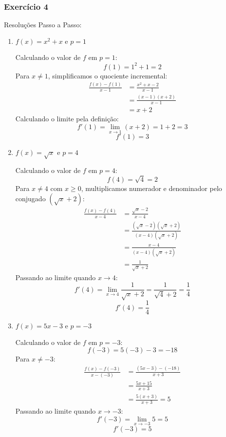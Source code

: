 \vspace{0.6cm}
\subsubsection*{Exercício 4}

Resoluções Passo a Passo:

\begin{enumerate}[label=\alph*)]
    \item $f(x) = x^2 + x$ e $p = 1$

    Calculando o valor de $f$ em $p = 1$:
    \[
    f(1) = 1^2 + 1 = 2
    \]
    Para $x \neq 1$, simplificamos o quociente incremental:
    \begin{align*}
        \frac{f(x) - f(1)}{x - 1} &= \frac{x^2 + x - 2}{x - 1} \\[0.20cm]
        &= \frac{(x - 1)(x + 2)}{x - 1} \\[0.20cm]
        &= x + 2
    \end{align*}
    Calculando o limite pela definição:
    \[
    f'(1) = \lim_{x \to 1} (x + 2) = 1 + 2 = 3
    \]
    \[
    f'(1) = 3
    \]

    \item $f(x) = \sqrt{x}$ e $p = 4$

    Calculando o valor de $f$ em $p = 4$:
    \[
    f(4) = \sqrt{4} = 2
    \]
    Para $x \neq 4$ com $x \ge 0$, multiplicamos numerador e denominador pelo conjugado $(\sqrt{x} + 2)$:
    \begin{align*}
        \frac{f(x) - f(4)}{x - 4} &= \frac{\sqrt{x} - 2}{x - 4} \\[0.20cm]
        &= \frac{(\sqrt{x} - 2)(\sqrt{x} + 2)}{(x - 4)(\sqrt{x} + 2)} \\[0.20cm]
        &= \frac{x - 4}{(x - 4)(\sqrt{x} + 2)} \\[0.20cm]
        &= \frac{1}{\sqrt{x} + 2}
    \end{align*}
    Passando ao limite quando $x \to 4$:
    \[
    f'(4) = \lim_{x \to 4} \frac{1}{\sqrt{x} + 2} = \frac{1}{\sqrt{4} + 2} = \frac{1}{4}
    \]
    \[
    f'(4) = \frac{1}{4}
    \]

    \item $f(x) = 5x - 3$ e $p = -3$

    Calculando o valor de $f$ em $p = -3$:
    \[
    f(-3) = 5(-3) - 3 = -18
    \]
    Para $x \neq -3$:
    \begin{align*}
        \frac{f(x) - f(-3)}{x - (-3)} &= \frac{(5x - 3) - (-18)}{x + 3} \\[0.20cm]
        &= \frac{5x + 15}{x + 3} \\[0.20cm]
        &= \frac{5(x + 3)}{x + 3} = 5
    \end{align*}
    Passando ao limite quando $x \to -3$:
    \[
    f'(-3) = \lim_{x \to -3} 5 = 5
    \]
    \[
    f'(-3) = 5
    \]


\end{enumerate}

